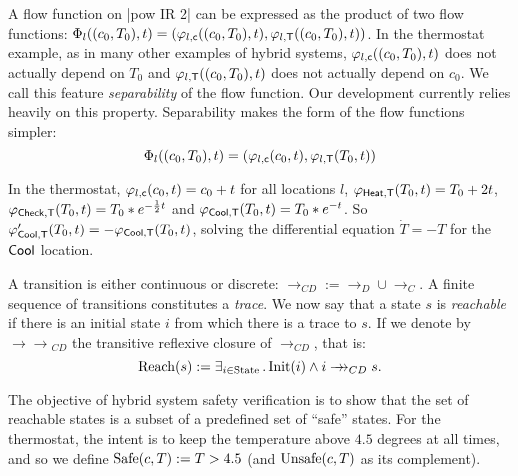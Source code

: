 \documentclass[runningheads]{llncs}
\newcommand{\Exists}[2]{\exists_{#1} \, . \, #2}
\def\phi{\varphi}
\newcommand{\weg}[1]{}
\newcommand{\ST}{{\sf T}}
\newcommand{\Sc}{{\sf c}}
\newcommand{\Heat}{{\sf Heat}}
\newcommand{\Cool}{{\sf Cool}}
\newcommand{\Chec}{{\sf Check}}
\newcommand{\State}{{\rm State}}
\newcommand{\Init}{{\rm Init}}
\newcommand{\Unsafe}{{\rm Unsafe}}
\newcommand{\Safe}{{\rm Safe}}
\newcommand{\Reach}{{\rm Reach}}
\newcommand{\trans}{\rightarrow_{CD}}
\newcommand{\doubleheadrightarrow}{\mathrel{\rightarrow\!\!\!\!\rightarrow}}
\newcommand{\ttrans}{\doubleheadrightarrow_{CD}}
\newcommand{\contrans}{\rightarrow_C}
\newcommand{\distrans}{\rightarrow_D}
\begin{document}
A flow function on |pow IR 2| can be expressed as the
product of two flow functions: $\Phi_l((c_0,T_0),t) = (\phi_{l,\Sc}((c_0,T_0),t),
\phi_{l,\ST}((c_0,T_0),t))$. In the thermostat example, as in many other
examples of hybrid systems, $\phi_{l,\Sc}((c_0,T_0),t)$ does not actually depend on $T_0$
and $\phi_{l,\ST}((c_0,T_0),t)$ does not actually depend on $c_0$. We call this feature
{\em separability\/} of the flow function. Our development currently
relies heavily on this property. Separability makes the form of the
flow functions simpler:
$$\Phi_l((c_0,T_0),t) = (\phi_{l,\Sc}(c_0,t), \phi_{l,\ST}(T_0,t))$$

In the thermostat, $\phi_{l,\Sc}(c_0,t) = c_0 + t$ for all locations
$l$, $\phi_{\Heat,\ST}(T_0,t)= T_0 + 2 t$, $\phi_{\Chec,\ST}(T_0,t)=
T_0 * e^{- \frac{1}{2}t}$ and $\phi_{\Cool,\ST}(T_0,t)= T_0 *
e^{-t}$. So $\phi'_{\Cool,\ST}(T_0,t)= - \phi_{\Cool,\ST}(T_0,t)$,
solving the differential equation $\dot{T} = - T$ for the $\Cool$
location.


\weg{
The reset function resets the clock for all
but one of these transitions, and leaves the temperature variable as
is. Here we can discern a conceptual distinction between continuous
variables directly controlled by the system (such as the clock in the
thermostat), and variables that model a physical phenomenon and that
can only be observed (such as the temperature in the thermostat). This
distinction is not made explicit in the definition of a hybrid system;
in principle, nothing is stopping the thermostat from treating
temperature as a variable of the former kind and resetting its
value. However, this would simply make the system unimplementable.
}

A transition is either continuous or discrete: $\trans:= \distrans
\cup \contrans$. A finite sequence of transitions constitutes a {\em trace}. We now say that a state $s$ is \emph{reachable} if
there is an initial state $i$ from which there is a trace to $s$.
If we denote by $\ttrans$ the transitive reflexive
closure of $\trans$, that is:
$$\Reach(s):=
    \Exists{i\in \State}{\Init(i) \wedge i \ttrans s}.$$

\weg{As mentioned before, the set of reachable states represents the
possible behaviours exhibited by a hypothetical real-world
implementation of the hybrid system (as software running on a device
with sensors and actuators).
}

The objective of hybrid system safety verification is to show that the set of reachable states is a subset of a predefined set of ``safe'' states. For the thermostat, the intent is to
keep the temperature above $4.5$ degrees at all times, and so we define $\Safe(c,T) := T > 4.5$ (and $\Unsafe(c,T)$ as its complement).
\end{document}
